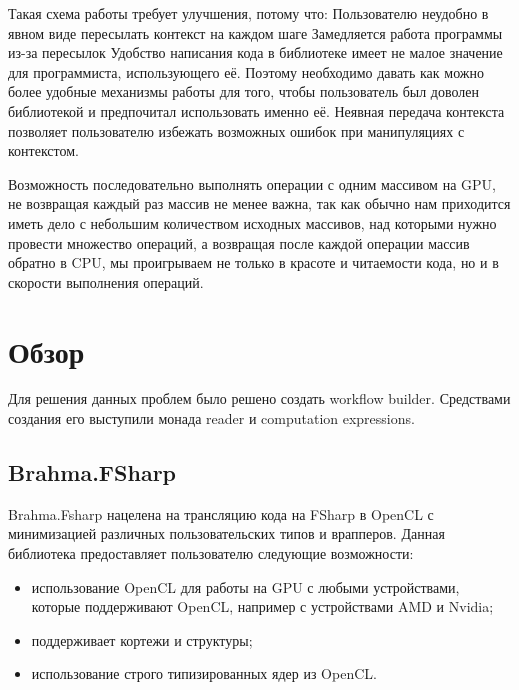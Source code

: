 \documentclass[14pt]{matmex-diploma-custom}
\begin{document}
Такая схема работы требует улучшения, потому что:
Пользователю неудобно в явном виде пересылать контекст на каждом шаге
Замедляется работа программы из-за пересылок
Удобство написания кода в библиотеке имеет не малое значение для программиста, использующего её. Поэтому необходимо давать как можно более удобные механизмы работы для того, чтобы пользователь был доволен библиотекой и предпочитал использовать именно её. Неявная передача контекста позволяет пользователю избежать возможных ошибок при манипуляциях с контекстом.

Возможность последовательно выполнять операции с одним массивом на GPU, не возвращая каждый раз массив не менее важна, так как обычно нам приходится иметь дело с небольшим количеством исходных массивов, над которыми нужно провести множество операций, а возвращая после каждой операции массив обратно в CPU, мы проигрываем не только в красоте и читаемости кода, но и в скорости выполнения операций.


\section{Обзор}
Для решения данных проблем было решено создать workflow builder. Средствами создания его выступили монада reader и computation expressions.
\subsection {Brahma.FSharp}
Brahma.Fsharp нацелена на трансляцию кода на FSharp в OpenCL с минимизацией различных пользовательских типов и врапперов.
Данная библиотека предоставляет пользователю следующие возможности:
\begin{itemize}
\item использование OpenCL для работы на GPU с любыми устройствами, которые поддерживают OpenCL, например с устройствами AMD и Nvidia;
\item поддерживает кортежи и структуры;
\item использование строго типизированных ядер из OpenCL.
\end{itemize}
\end{document}
